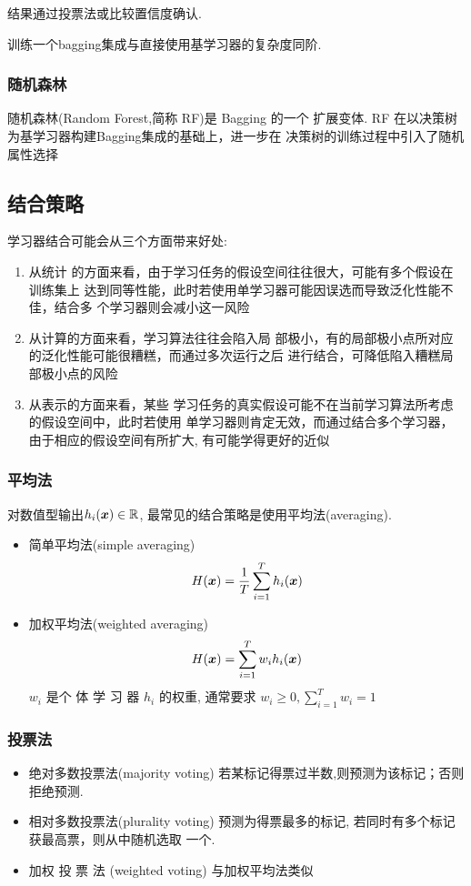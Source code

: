 结果通过投票法或比较置信度确认. 

训练一个bagging集成与直接使用基学习器的复杂度同阶. 

\subsubsection{随机森林}
随机森林(Random Forest,简称 RF)是 Bagging 的一个
扩展变体. RF 在以决策树为基学习器构建Bagging集成的基础上，进一步在
决策树的训练过程中引入了随机属性选择

\subsection{结合策略}
学习器结合可能会从三个方面带来好处: 
\begin{enumerate}
    \item 从统计
    的方面来看，由于学习任务的假设空间往往很大，可能有多个假设在训练集上
    达到同等性能，此时若使用单学习器可能因误选而导致泛化性能不佳，结合多
    个学习器则会减小这一风险
    \item 从计算的方面来看，学习算法往往会陷入局
    部极小，有的局部极小点所对应的泛化性能可能很糟糕，而通过多次运行之后
    进行结合，可降低陷入糟糕局部极小点的风险
    \item 从表示的方面来看，某些
    学习任务的真实假设可能不在当前学习算法所考虑的假设空间中，此时若使用
    单学习器则肯定无效，而通过结合多个学习器，由于相应的假设空间有所扩大,
    有可能学得更好的近似
\end{enumerate}


\subsubsection{平均法}
对数值型输出$h_i(\bm{x})\in\mathbb{R}$, 最常见的结合策略是使用平均法(averaging).
\begin{itemize}
    \item 简单平均法(simple averaging)
    \begin{align*}
        H(\bm{x})=\frac{1}{T}\sum_{i=1}^T h_i(\bm{x})
    \end{align*}
    \item 加权平均法(weighted averaging)
    \begin{align*}
        H(\bm{x})=\sum_{i=1}^Tw_ih_i(\bm{x})
    \end{align*}
    $w_i$  是个 体 学 习 器 $h_i$ 的权重, 通常要求 $w_i\ge 0, \displaystyle \sum_{i=1}^Tw_i=1$
\end{itemize}
\subsubsection{投票法}
\begin{itemize}
    \item 绝对多数投票法(majority voting)
    \subitem 若某标记得票过半数,则预测为该标记；否则拒绝预测.
    \item 相对多数投票法(plurality voting)
    \subitem 预测为得票最多的标记, 若同时有多个标记获最高票，则从中随机选取
    一个.
    \item  加权 投 票 法 (weighted voting)
    \subitem 与加权平均法类似
\end{itemize}
